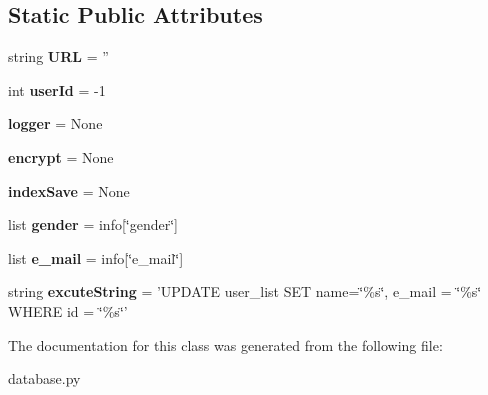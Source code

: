 \subsection*{Static Public Attributes}
\begin{DoxyCompactItemize}
\item 
\hypertarget{classweb_1_1database_1_1_sqlite_database_aa62e00d2f526c1346d4391a4d649a19a}{string {\bfseries U\-R\-L} = ''}\label{classweb_1_1database_1_1_sqlite_database_aa62e00d2f526c1346d4391a4d649a19a}

\item 
\hypertarget{classweb_1_1database_1_1_sqlite_database_af5d008512a8d152ad79c1b9cfc58097d}{int {\bfseries user\-Id} = -\/1}\label{classweb_1_1database_1_1_sqlite_database_af5d008512a8d152ad79c1b9cfc58097d}

\item 
\hypertarget{classweb_1_1database_1_1_sqlite_database_a1d968a28b9a00bfaaf4e5ac2e5f92690}{{\bfseries logger} = None}\label{classweb_1_1database_1_1_sqlite_database_a1d968a28b9a00bfaaf4e5ac2e5f92690}

\item 
\hypertarget{classweb_1_1database_1_1_sqlite_database_a2b876b67d049ed3ef82feacbc243d3a7}{{\bfseries encrypt} = None}\label{classweb_1_1database_1_1_sqlite_database_a2b876b67d049ed3ef82feacbc243d3a7}

\item 
\hypertarget{classweb_1_1database_1_1_sqlite_database_a50b151e9a3e9cff8d36526b2bb89fa62}{{\bfseries index\-Save} = None}\label{classweb_1_1database_1_1_sqlite_database_a50b151e9a3e9cff8d36526b2bb89fa62}

\item 
\hypertarget{classweb_1_1database_1_1_sqlite_database_a0b783641b69364d5118705bf4b86c472}{list {\bfseries gender} = info\mbox{[}\char`\"{}gender\char`\"{}\mbox{]}}\label{classweb_1_1database_1_1_sqlite_database_a0b783641b69364d5118705bf4b86c472}

\item 
\hypertarget{classweb_1_1database_1_1_sqlite_database_a2a8703cf9c38155c5aa718bfb865d906}{list {\bfseries e\-\_\-mail} = info\mbox{[}\char`\"{}e\-\_\-mail\char`\"{}\mbox{]}}\label{classweb_1_1database_1_1_sqlite_database_a2a8703cf9c38155c5aa718bfb865d906}

\item 
\hypertarget{classweb_1_1database_1_1_sqlite_database_aa8bf127420f658556995eb701e269d0a}{string {\bfseries excute\-String} = 'U\-P\-D\-A\-T\-E user\-\_\-list S\-E\-T name=\char`\"{}\%s\char`\"{}, e\-\_\-mail = \char`\"{}\%s\char`\"{} W\-H\-E\-R\-E id = \char`\"{}\%s\char`\"{}'}\label{classweb_1_1database_1_1_sqlite_database_aa8bf127420f658556995eb701e269d0a}

\end{DoxyCompactItemize}


The documentation for this class was generated from the following file\-:\begin{DoxyCompactItemize}
\item 
database.\-py\end{DoxyCompactItemize}
